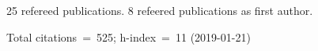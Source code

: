25 refereed publications. 8 refeered publications as first author.

Total citations~=~525; h-index~=~11 (2019-01-21)